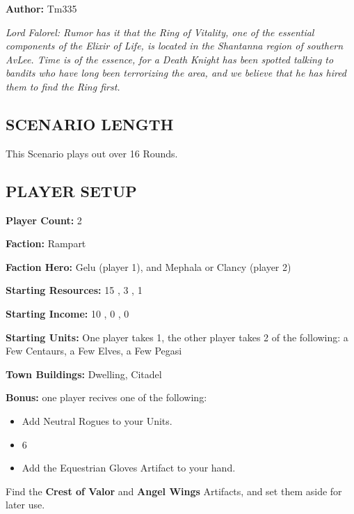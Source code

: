 
\begin{multicols*}{2}

\textbf{Author:} Tm335

\textit{Lord Falorel: Rumor has it that the Ring of Vitality, one of the essential components of the Elixir of Life, is located in the Shantanna region of southern AvLee.
  Time is of the essence, for a Death Knight has been spotted talking to bandits who have long been terrorizing the area, and we believe that he has hired them to find the Ring first.
}


\subsection*{\MakeUppercase{Scenario Length}}

This Scenario plays out over 16 Rounds.

\subsection*{\MakeUppercase{Player Setup}}

\textbf{Player Count:} 2

\textbf{Faction:} Rampart

\textbf{Faction Hero:} Gelu (player 1), and Mephala or Clancy (player 2)

\textbf{Starting Resources:} 15 , 3 , 1 

\textbf{Starting Income:} 10 , 0 , 0 

\textbf{Starting Units:} One player takes 1, the other player takes 2 of the following: a Few Centaurs, a Few Elves, a Few Pegasi

\textbf{Town Buildings:}  Dwelling, Citadel

\textbf{Bonus:} one player recives one of the following:
\begin{itemize}
  \item Add Neutral  Rogues to your Units.
  \item 6 
  \item Add the Equestrian Gloves Artifact to your hand.
\end{itemize}

Find the \textbf{Crest of Valor} and \textbf{Angel Wings} Artifacts, and set them aside for later use.


\end{multicols*}
